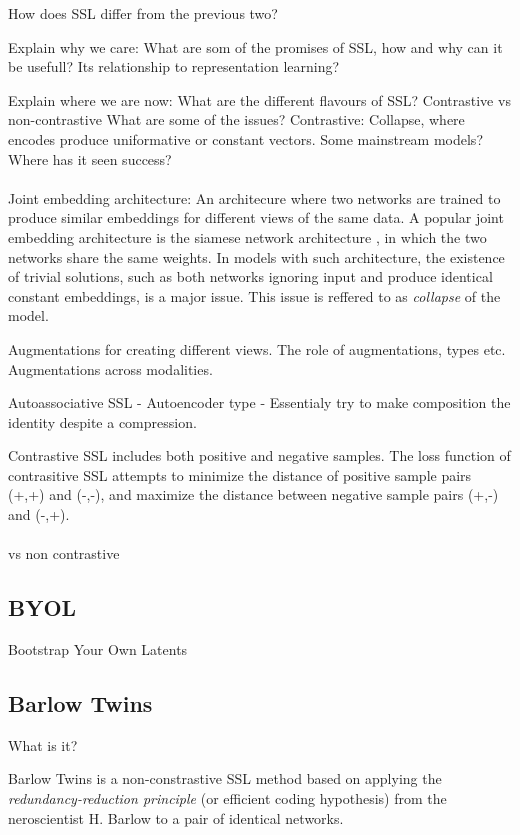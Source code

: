 \documentclass[../../thesis.tex]{subfiles}
\begin{document}
How does SSL differ from the previous two?

Explain why we care:
What are som of the promises of SSL, how and why can it be usefull?
Its relationship to representation learning?

Explain where we are now:
What are the different flavours of SSL? Contrastive vs non-contrastive
What are some of the issues? 
Contrastive: Collapse, where encodes produce uniformative or constant vectors.
Some mainstream models? 
Where has it seen success?\\\\

Joint embedding architecture: An architecure where two networks are trained to produce similar embeddings for different views of the same data. A popular joint embedding architecture is the siamese network architecture \cite{siamese}, in which the two networks share the same weights. In models with such architecture, the existence of trivial solutions, such as both networks ignoring input and produce identical constant embeddings, is a major issue. This issue is reffered to as \textit{collapse} of the model.

Augmentations for creating different views. The role of augmentations, types etc. Augmentations across modalities. 


Autoassociative SSL - Autoencoder type - Essentialy try to make composition the identity despite a compression. 

Contrastive SSL includes both positive and negative samples. The loss function of contrasitive SSL attempts to minimize the distance of positive sample pairs (+,+) and (-,-), and maximize the distance between negative sample pairs (+,-) and (-,+).\\\\

vs non contrastive

\subsection{BYOL}
Bootstrap Your Own Latents


\subsection{Barlow Twins}
What is it?

Barlow Twins is a non-constrastive SSL method based on applying the \textit{redundancy-reduction principle} (or efficient coding hypothesis) \cite{Barlow_origin} from the neroscientist H. Barlow to a pair of identical networks. 
\end{document}
